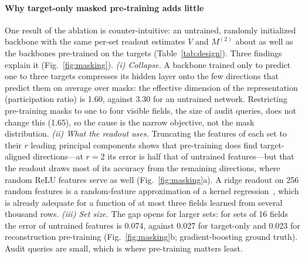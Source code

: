 \paragraph{Why target-only masked pre-training adds little}
One result of the ablation is counter-intuitive: an untrained, randomly initialized backbone with the same per-set
readout estimates $V$ and $M^{(2)}$ about as well as the backbones pre-trained on the targets
(Table~\ref{tab:design}). Three findings explain it (Fig.~\ref{fig:masking}).
\emph{(i) Collapse.} A backbone trained only to predict one to three targets compresses its hidden layer onto the few
directions that predict them on average over masks: the effective dimension of the representation (participation
ratio) is 1.60, against 3.30 for an untrained network. Restricting pre-training masks to one to four visible
fields, the size of audit queries, does not change this (1.65), so the cause is the narrow objective, not the mask
distribution. \emph{(ii) What the readout uses.} Truncating the features of each set to their $r$ leading principal
components shows that pre-training does find target-aligned directions---at $r=2$ its error is half that of untrained
features---but that the readout draws most of its accuracy from the remaining directions, where random ReLU features
serve as well (Fig.~\ref{fig:masking}a). A ridge readout on 256 random features is a random-feature approximation of a
kernel regression~\cite{rahimi2007random}, which is already adequate for a function of at most three fields learned
from several thousand rows. \emph{(iii) Set size.} The gap opens for larger sets: for sets of 16 fields the error of
untrained features is 0.074, against 0.027 for target-only and 0.023 for reconstruction pre-training
(Fig.~\ref{fig:masking}b; gradient-boosting ground truth). Audit queries are small, which is where pre-training matters
least.

